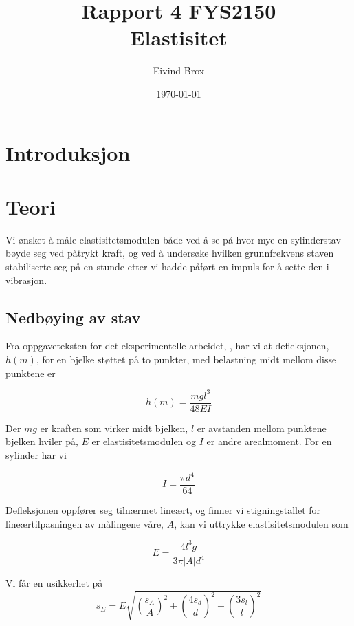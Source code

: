 \documentclass[a4paper,11pt, twocolumn]{article}
\title{Rapport 4 FYS2150\\Elastisitet}
\author{Eivind Brox}
\date{\today}
\begin{document}
\maketitle

\listoftodos

\begin{abstract}

\end{abstract}

\section{Introduksjon}
   
\section{Teori}
Vi ønsket å måle elastisitetsmodulen både ved å se på hvor mye en sylinderstav bøyde seg ved påtrykt kraft, og ved å undersøke hvilken grunnfrekvens staven stabiliserte seg på en stunde etter vi hadde påført en impuls for å sette den i vibrasjon.
\subsection{Nedbøying av stav}
Fra oppgaveteksten for det eksperimentelle arbeidet, \cite{oppgavetekst}, har vi at defleksjonen, $h(m)$, for en bjelke støttet på to punkter, med belastning midt mellom disse punktene er

\begin{equation}
	h(m) = \frac{mgl^3}{48EI}
	\label{eq:h}
\end{equation}

Der $mg$ er kraften som virker midt bjelken, $l$ er avstanden mellom punktene bjelken hviler på, $E$ er elastisitetsmodulen og $I$ er andre arealmoment. For en sylinder har vi

\begin{equation}
	I = \frac{\pi d^4}{64}
\end{equation}

Defleksjonen oppfører seg tilnærmet lineært, og finner vi stigningstallet for lineærtilpasningen av målingene våre, $A$, kan vi uttrykke elastisitetsmodulen som  

\begin{equation}
	E = \frac{4l^3g}{3\pi |A|d^4}
	\label{eq:elastisitetsmodulDefleksjon}
\end{equation}

Vi får en usikkerhet på
\begin{equation}
	s_E = E\sqrt{\left(\frac{s_A}{A}\right)^2+\left(\frac{4s_d}{d}\right)^2+\left(\frac{3s_l}{l}\right)^2}	
	\label{eq:feilDefleksjon}
\end{equation}
\end{document}
